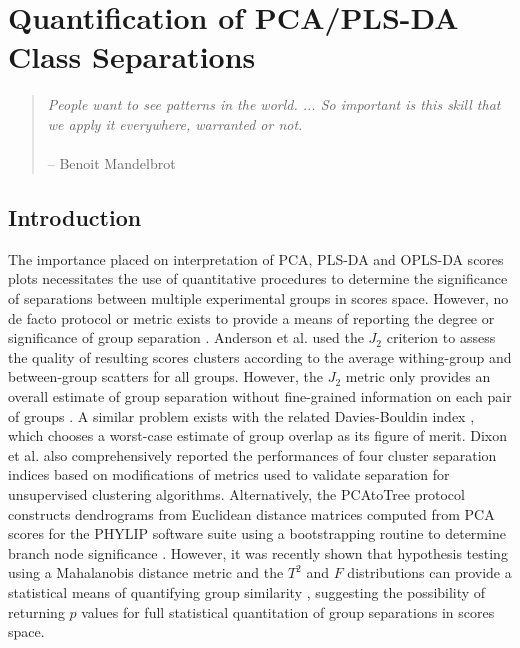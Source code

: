
\chapter{Quantification of PCA/PLS-DA Class Separations}

\begin{quote}
{\it
  People want to see patterns in the world. ... So important is this skill
  that we apply it everywhere, warranted or not.}
\\\\
 -- Benoit Mandelbrot
\end{quote}

\section{Introduction}

\begin{doublespace}
The importance placed on interpretation of PCA, PLS-DA and OPLS-DA scores plots
necessitates the use of quantitative procedures to determine the significance
of separations between multiple experimental groups in scores space. However,
no de facto protocol or metric exists to provide a means of reporting the
degree or significance of group separation
\cite{werth:abio2010,goodpaster:abio2010,goodpaster:cils2011}.
Anderson et al. used the $J_2$ criterion
\cite{anderson:metab2008,koutroumbas2006} to assess the quality of
resulting scores clusters according to the average withing-group and
between-group scatters for all groups. However, the $J_2$ metric only provides
an overall estimate of group separation without fine-grained information on
each pair of groups \cite{koutroumbas2006}. A similar problem exists
with the related Davies-Bouldin index \cite{davies:ieee1979}, which
chooses a worst-case estimate of group overlap as its figure of merit. Dixon
et al. \cite{dixon:jchemo2009} also comprehensively reported the
performances of four cluster separation indices based on modifications of
metrics used to validate separation for unsupervised clustering algorithms.
Alternatively, the PCAtoTree protocol constructs dendrograms from Euclidean
distance matrices computed from PCA scores for the PHYLIP
\cite{felsenstein:clad1989} software suite using a bootstrapping routine to
determine branch node significance \cite{werth:abio2010,retief:mmbio2000}.
However, it was recently shown that hypothesis testing using a Mahalanobis
distance metric and the $T^2$ and $F$ distributions can provide a statistical
means of quantifying group similarity \cite{goodpaster:cils2011}, suggesting
the possibility of returning $p$ values for full statistical quantitation of
group separations in scores space.
\end{doublespace}

